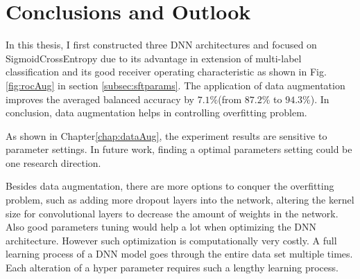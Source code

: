 \chapter{Conclusions and Outlook}
\label{chap:conclusion}
In this thesis, I first constructed three DNN architectures and focused on SigmoidCrossEntropy due to its advantage in extension of multi-label classification and its good receiver operating characteristic as shown in Fig.\ref{fig:rocAug} in section \ref{subsec:sftparams}. The application of data augmentation improves the averaged balanced accuracy by $7.1\%$(from $87.2\%$ to $94.3\%$). In conclusion, data augmentation helps in controlling overfitting problem.

As shown in Chapter\ref{chap:dataAug}, the experiment results are sensitive to parameter settings. In future work, finding a optimal parameters setting could be one research direction. 

Besides data augmentation, there are more options to conquer the overfitting problem, such as adding more dropout layers into the network, altering the kernel size for convolutional layers to decrease the amount of weights in the network. Also good parameters tuning would help a lot when optimizing the DNN architecture. However such optimization is computationally very costly. A full learning process of a DNN model goes through the entire data set multiple times. Each alteration of a hyper parameter requires such a lengthy learning process.